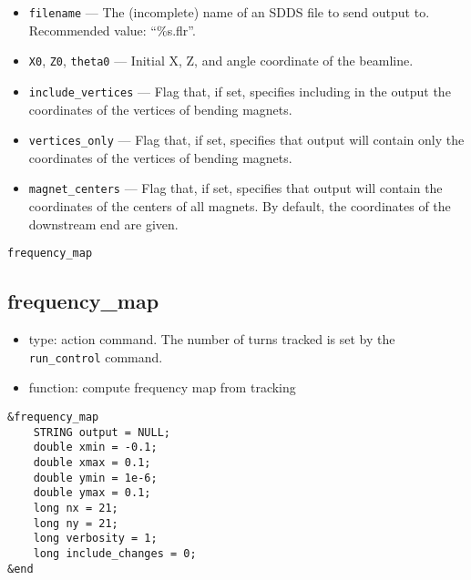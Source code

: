 \documentclass[11pt]{article}
\begin{document}
\begin{itemize}
\item \verb|filename| --- The (incomplete) name of an SDDS file to send output to.  
 Recommended value: ``\%s.flr''.
\item \verb|X0|, \verb|Z0|, \verb|theta0| --- Initial X, Z, and angle coordinate of the beamline.
\item \verb|include_vertices| --- Flag that, if set, specifies including  in the output
the coordinates of the vertices of bending magnets.
\item \verb|vertices_only| --- Flag that, if set, specifies that output will contain only
the coordinates of the vertices of bending magnets.
\item \verb|magnet_centers| --- Flag that, if set, specifies that output will contain 
the coordinates of the centers of all magnets.  By default, the coordinates of the downstream
end are given.
\end{itemize}

\begin{latexonly}
\newpage
\begin{center}{\Large\verb|frequency_map|}\end{center}
\end{latexonly}
\subsection{frequency\_map \label{subsec:frequencymap}}

\begin{itemize}
\item type: action command.  
        The number of turns tracked is set by the \verb|run_control| command.
\item function: compute frequency map from tracking
\end{itemize}

\begin{verbatim}
&frequency_map
    STRING output = NULL;
    double xmin = -0.1;
    double xmax = 0.1;
    double ymin = 1e-6;
    double ymax = 0.1;
    long nx = 21;
    long ny = 21;
    long verbosity = 1;
    long include_changes = 0;
&end
\end{verbatim}
\end{document}

